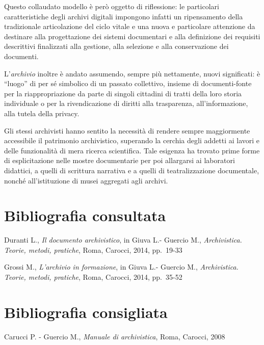 \documentclass[
  b5paper,
  twoside,
  11pt,
  chapterprefix=false,
  bibliography=totocnumbered,
  parskip=0]{scrbook}
\begin{document}
Questo collaudato modello è però oggetto di riflessione: le particolari
caratteristiche degli archivi digitali impongono infatti un ripensamento
della tradizionale articolazione del ciclo vitale e una nuova e
particolare attenzione da destinare alla progettazione dei sistemi
documentari e alla definizione dei requisiti descrittivi finalizzati
alla gestione, alla selezione e alla conservazione dei documenti.

L'\emph{archivio} inoltre è andato assumendo, sempre più nettamente, nuovi
significati: è \enquote{luogo} di per sé simbolico di un passato collettivo,
insieme di documenti-fonte per la riappropriazione da parte di singoli
cittadini di tratti della loro storia individuale o per la
rivendicazione di diritti alla trasparenza, all'informazione, alla
tutela della privacy.

Gli stessi archivisti hanno sentito la necessità di rendere sempre
maggiormente accessibile il patrimonio archivistico, superando la
cerchia degli addetti ai lavori e delle funzionalità di mera ricerca
scientifica. Tale esigenza ha trovato prime forme di esplicitazione
nelle mostre documentarie per poi allargarsi ai laboratori didattici, a
quelli di scrittura narrativa e a quelli di teatralizzazione
documentale, nonché all'istituzione di musei aggregati agli archivi.

\hypertarget{bibliografia-consultata}{%
\section*{Bibliografia consultata}\label{bibliografia-consultata}}

Duranti L., \emph{Il documento archivistico}, in Giuva L.- Guercio M.,
\emph{Archivistica. Teorie, metodi, pratiche}, Roma, Carocci, 2014, pp.~19-33

Grossi M., \emph{L'archivio in formazione}, in Giuva L.- Guercio M.,
\emph{Archivistica. Teorie, metodi, pratiche}, Roma, Carocci, 2014, pp.~35-52

\hypertarget{bibliografia-consigliata}{%
\section*{Bibliografia consigliata}\label{bibliografia-consigliata}}

Carucci P. - Guercio M., \emph{Manuale di archivistica}, Roma, Carocci, 2008
\end{document}
